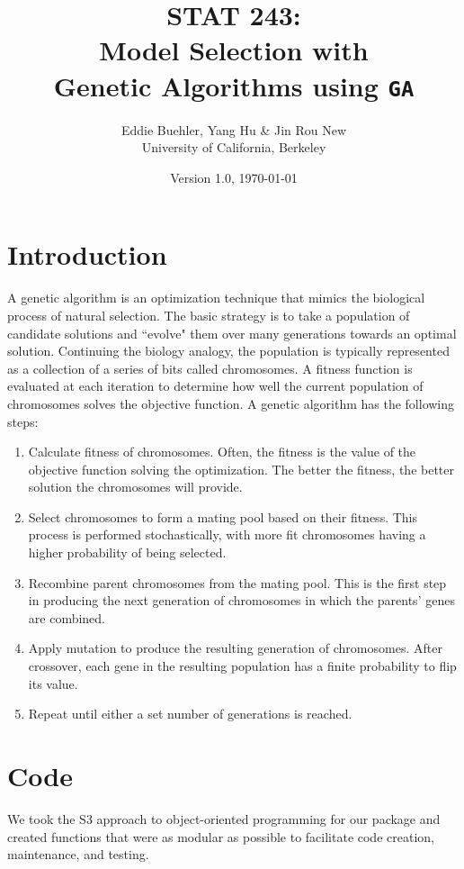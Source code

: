 \documentclass[11pt]{article}
\title{STAT 243: \\
	Model Selection with\\ 
	Genetic Algorithms using \texttt{GA}}
\author{Eddie Buehler, Yang Hu \& Jin Rou New\\
	University of California, Berkeley}
\date{Version 1.0, \today}
\begin{document}
\maketitle

\section{Introduction}
\label{sec:introduction}
A genetic algorithm is an optimization technique that mimics the
biological process of natural selection. The basic strategy is to take
a population of candidate solutions and ``evolve" them over many generations towards an
optimal solution. Continuing the biology analogy, the
population is typically represented as a collection of a series of bits called chromosomes. A fitness function is evaluated at each iteration to
determine how well the current population of chromosomes solves the objective
function. A genetic algorithm has the following steps: 
\begin{enumerate}
	\item Calculate fitness of chromosomes. Often, the
          fitness is the value of the objective function solving the
          optimization. The better the fitness, the better solution
          the chromosomes will provide.
	\item Select chromosomes to form a mating pool based on their
          fitness. This process is performed stochastically, with more
          fit chromosomes having a higher probability of being
          selected. 
	\item Recombine parent chromosomes from the mating pool. This
          is the first step in producing the next generation of
          chromosomes in which the parents' genes are combined.
	\item Apply mutation to produce the resulting generation of
          chromosomes. After crossover, each gene in the resulting
          population has a finite probability to flip its value.
    \item Repeat until either a set number of generations is reached.
\end{enumerate}

\section{Code}
\label{sec:code}
We took the S3 approach to object-oriented programming for our package and created functions that were as modular as possible to facilitate code creation, maintenance, and testing.
\end{document}
